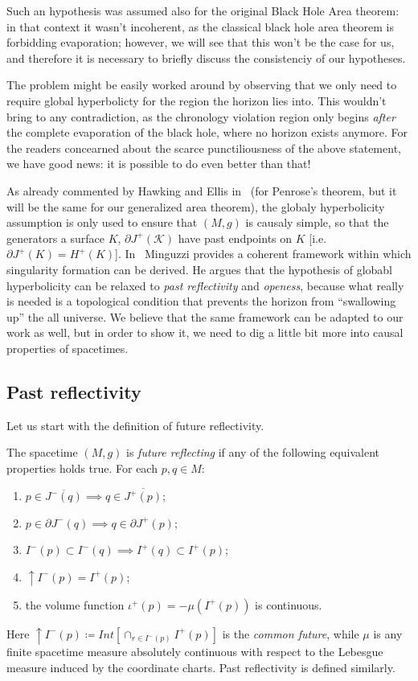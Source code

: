 Such an hypothesis was assumed also for the original Black Hole Area theorem: in that context it wasn't incoherent, as the classical black hole area theorem is forbidding evaporation; however, we will see that this won't be the case for us, and therefore it is necessary to briefly discuss the consistenciy of our hypotheses.

The problem might be easily worked around by observing that we only need to require global hyperbolicty for the region the horizon lies into. This wouldn't bring to any contradiction, as the chronology violation region only begins \emph{after} the complete evaporation of the black hole, where no horizon exists anymore. For the readers concearned about the scarce punctiliousness of the above statement, we have good news: it is possible to do even better than that! 

As already commented by Hawking and Ellis in~\cite[]{hawking1973large} (for Penrose's theorem, but it will be the same for our generalized area theorem), the globaly hyperbolicity assumption is only used to ensure that \((M, g)\) is causaly simple, so that the generators a surface \(K\), \(\partial J^+(\mathscr{K})\) have past endpoints on \(K\) [i.e. \(\partial J^+(K) = H^+(K)\)].
In~\cite{minguzzi2020gravitational} Minguzzi provides a coherent framework within which singularity formation can be derived. He argues that the hypothesis of globabl hyperbolicity can be relaxed to \emph{past reflectivity} and \emph{openess}, because what really is needed is a topological condition that prevents the horizon from ``swallowing up'' the all universe. We believe that the same framework can be adapted to our work as well, but in order to show it, we need to dig a little bit more into causal properties of spacetimes.

\subsection{Past reflectivity}
	\label{subsec:past-reflectivity}
	Let us start with the definition of future reflectivity.
	\begin{definition}
		The spacetime \((M,g)\) is \emph{future reflecting} if any of the following equivalent properties holds true. For each \(p, q\in M\):
		\begin{enumerate}
			\item \(p\in \overline{ J^-(q)} \implies q\in \overline{J^+(p)}\);
			\item  \(p\in \partial J^-(q) \implies q\in \partial J^+(p)\);
			\item \(I^-(p) \subset I^-(q) \implies I^+(q) \subset I^+(p)\);
			\item \(\uparrow I^-(p) = I^+(p)\);
			\item the volume function \(\iota^+(p) = - \mu(I^+(p))\) is continuous.
		\end{enumerate}
	\end{definition}
	Here \(\uparrow I^-(p) \coloneqq Int\left[\cap_{r\in I^-(p)}I^+(p)\right]\) is the \emph{common future}, while \(\mu\) is any finite spacetime measure absolutely continuous with respect to the Lebesgue measure induced by the coordinate charts. Past reflectivity is defined similarly.

